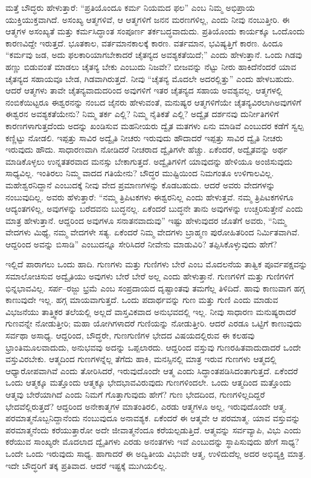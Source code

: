 ಮತ್ತೆ ಬೌದ್ಧರು ಹೇಳುತ್ತಾರೆ: “ಪ್ರತಿಯೊಂದೂ ಕರ್ಮ ನಿಯಮದ ಫಲ” ಎಂಬ ನಿಮ್ಮ ಅಭಿಪ್ರಾಯ ಯುಕ್ತಿಯುಕ್ತವಾಗಿದೆ. ಅಸಂಖ್ಯ ಆತ್ಮಗಳಿವೆ, ಆ ಆತ್ಮಗಳಿಗೆ ಜನನ ಮರಣಗಳಿಲ್ಲ, ಎಂದು ನೀವು ನಂಬುತ್ತೀರಿ. ಈ ಆತ್ಮಗಳ ಅಸಂಖ್ಯತೆ ಮತ್ತು ಕರ್ಮಸಿದ್ಧಾಂತ ಸಂಪೂರ್ಣ ತರ್ಕಬದ್ಧವಾದುದು. ಪ್ರತಿಯೊಂದು ಕಾರ್ಯಕ್ಕೂ ಒಂದೊಂದು ಕಾರಣವಿದ್ದೇ ಇರುತ್ತದೆ. ಭೂತಕಾಲ, ವರ್ತಮಾನಕಾಲಕ್ಕೆ ಕಾರಣ. ವರ್ತಮಾನ, ಭವಿಷ್ಯತ್ತಿಗೆ ಕಾರಣ. ಹಿಂದೂ “ಕರ್ಮವು ಜಡ, ಅದು ಫಲಕಾರಿಯಾಗಬೇಕಾದರೆ ಚೈತನ್ಯದ ಅವಶ್ಯಕತೆಯಿದೆ;” ಎಂದು ಹೇಳುತ್ತಾನೆ. ಒಂದು ಗಿಡವು ಹಣ್ಣು ಬಿಡುವಂತೆ ಮಾಡಲು ಚೈತನ್ಯ ಬೇಕು ಎಂಬುದು ನಿಜವೇ? ಬೀಜವನ್ನು ನೆಟ್ಟು ನೀರು ಹಾಕಿದೆನೆಂದರೆ ಯಾವ ಚೈತನ್ಯದ ಸಹಾಯವೂ ಬೇಡ, ಗಿಡವಾಗಿರುತ್ತದೆ. ನೀವು “ಚೈತನ್ಯ ಮೊದಲೇ ಅದರಲ್ಲಿತ್ತು” ಎಂದು ಹೇಳಬಹುದು. ಆದರೆ ಆತ್ಮಗಳು ತಾವೇ ಚೈತನ್ಯವಾದುದರಿಂದ ಅವುಗಳಿಗೆ ಇತರ ಚೈತನ್ಯದ ಸಹಾಯ ಅವಶ್ಯವಲ್ಲ. ಆತ್ಮಗಳಲ್ಲಿ ನಂಬಿಕೆಯಿಟ್ಟರೂ ಈಶ್ವರನನ್ನು ನಂಬದ ಜೈನರು ಹೇಳುವಂತೆ, ಮನುಷ್ಯರ ಆತ್ಮಗಳಿಗೆಯೇ ಚೈತನ್ಯವಿರಲಾಗಿ\break ಅವುಗಳಿಗೆ ಈಶ್ವರನ ಅವಶ್ಯಕತೆಯೇನು? ನಿಮ್ಮ ತರ್ಕ ಎಲ್ಲಿ? ನಿಮ್ಮ ನೈತಿಕತೆ ಎಲ್ಲಿ? ಅದ್ವೈತ ದರ್ಶನವು ದುರ್ನೀತಿಗಳಿಗೆ ಕಾರಣಗಳಾಗುತ್ತದೆಂದು ಅದನ್ನು ಖಂಡಿಸುವ ಮಹನೀಯರು ದ್ವೈತ ಮತಗಳು ಏನು ಮಾಡಿವೆ ಎಂಬುದರ ಕಡೆಗೆ ಸ್ವಲ್ಪ ಕಣ್ಣಿಟ್ಟು ನೋಡಲಿ. ಇಪ್ಪತ್ತು ಸಾವಿರ ಅದ್ವೈತಿ ನೀಚರು ಇರುವುದು ಹೌದಾದರೆ ಇಪ್ಪತ್ತು ಸಾವಿರ ದ್ವೈತಿ ನೀಚರು ಇರುವುದು ಹೌದು. ಸಾಧಾರಣವಾಗಿ ನೋಡಿದರೆ ನೀಚರಾದ ದ್ವೈತಿಗಳೇ ಹೆಚ್ಚು. ಏಕೆಂದರೆ, ಅದ್ವೈತವನ್ನು ಅರ್ಥ ಮಾಡಿಕೊಳ್ಳಲು ಉನ್ನತತರವಾದ ಮನಸ್ಸು ಬೇಕಾಗುತ್ತದೆ. ಅದ್ವೈತಿಗಳಿಗೆ ಯಾವುದನ್ನು ಹೇಳಿಯೂ ಅಂಜಿಸುವುದು ಸಾಧ್ಯವಿಲ್ಲ. ಇಂತಿರಲು ನಿಮ್ಮ ವಾದದ ಗತಿಯೇನು? ಬೌದ್ಧರ ಮುಷ್ಟಿಯಿಂದ ನಿಮಗಂತೂ ಉಳಿಗಾಲವಿಲ್ಲ. ಮಹೇಶ್ವರನಿದ್ದಾನೆ ಎಂಬುದಕ್ಕೆ ನೀವು ವೇದ ಪ್ರಮಾಣಗಳನ್ನು ಕೊಡಬಹುದು. ಆದರೆ ಅವರು ವೇದಗಳನ್ನು ನಂಬುವುದಿಲ್ಲ. ಅವರು ಹೆಳುತ್ತಾರೆ: “ನಮ್ಮ ತ್ರಿಪಿಟಕಗಳು ಈಶ್ವರನಿಲ್ಲ ಎಂದು ಹೇಳುತ್ತವೆ. ನಮ್ಮ ತ್ರಿಪಿಟಕಗಳಿಗೂ ಆದ್ಯಂತಗಳಿಲ್ಲ, ಅವುಗಳನ್ನು ಬರೆದವನು ಬುದ್ಧನಲ್ಲ. ಏಕೆಂದರೆ ಬುದ್ಧನೇ ತಾನು ಅವುಗಳನ್ನು ಉಚ್ಚರಿಸುತ್ತೇನೆ ಎಂದು ಮಾತ್ರ ಹೇಳುತ್ತಾನೆ. ಆದ್ದರಿಂದ ಅವುಗಳೂ ಸನಾತನವಾದುವು” ಇಷ್ಟು ಹೇಳುವುದರ ಜೊತೆಗೆ ಅವರು, “ನಿಮ್ಮ ವೇದಗಳು ಮಿಥ್ಯೆ, ನಮ್ಮ ವೇದಗಳೇ ಸತ್ಯ. ಏಕೆಂದರೆ ನಿಮ್ಮ ವೇದಗಳು ಬ್ರಾಹ್ಮಣ ಪುರೋಹಿತರಿಂದ ನಿರ್ಮಿತವಾಗಿವೆ. ಆದ್ದರಿಂದ ಅವನ್ನು ಬಿಸಾಡಿ” ಎಂಬುದನ್ನೂ ಸೇರಿಸಿದರೆ ನೀವೇನು ಮಾಡುವಿರಿ? ತಪ್ಪಿಸಿಕೊಳ್ಳುವುದು ಹೇಗೆ?

ಇಲ್ಲಿದೆ ಪಾರಾಗಲು ಒಂದು ಹಾದಿ. ಗುಣಗಳು ಮತ್ತು ಗುಣಿಗಳು ಬೇರೆ ಎಂಬ ಮೊದಲನೆಯ ತಾತ್ವಿಕ ಪೂರ್ವಪಕ್ಷವನ್ನು ಸಮಾಲೋಚಿಸುವ ಅದ್ವೈತಿಯು ಅವುಗಳು ಬೇರೆ ಬೇರೆ ಅಲ್ಲ ಎಂದು ಹೇಳುತ್ತಾನೆ. ಗುಣಗಳಿಗೆ ಮತ್ತು ಗುಣಿಗಳಿಗೆ ಭಿನ್ನಭಾವವಿಲ್ಲ. ಸರ್ಪ–ರಜ್ಜು ಭ್ರಮೆ ಎಂಬ ಸಂಪ್ರದಾಯದ ದೃಷ್ಟಾಂತವು ತಮಗೆಲ್ಲ ತಿಳಿದಿದೆ. ಹಾವು ಕಾಣುವಾಗ ಹಗ್ಗ ಕಾಣುವುದೇ ಇಲ್ಲ. ಹಗ್ಗ ಮಾಯವಾಗುತ್ತದೆ. ಒಂದು ಪದಾರ್ಥವನ್ನು ಗುಣ ಮತ್ತು ಗುಣಿ ಎಂದು ಮಾಡುವ ವಿಭಜನೆಯು ತಾತ್ತ್ವಿಕರ ತಲೆಯಲ್ಲಿ ಅಲ್ಲದೆ ವಾಸ್ತವಿಕವಾದ ಅನುಭವದಲ್ಲಿ ಇಲ್ಲ. ನೀವು ಸಾಧಾರಣ ಮನುಷ್ಯರಾದರೆ ಗುಣವನ್ನೇ ನೋಡುತ್ತೀರಿ; ಮಹಾ ಯೋಗಿಗಳಾದರೆ ಗುಣಿಯನ್ನು ನೋಡುತ್ತೀರಿ. ಆದರೆ ಎರಡೂ ಒಟ್ಟಿಗೆ ಕಾಣುವುದು ಸರ್ವಥಾ ಅಸಾಧ್ಯ. ಆದ್ದರಿಂದ, ಬೌದ್ಧರೇ, ಗುಣಗುಣಿಗಳ ಭೇದದ ವಿಷಯದಲ್ಲಿರುವ ಈ ಕಲಹವು ಭ್ರಾಂತಿಮೂಲವಾದುದು, ಅನುಭವವು ಅದನ್ನು ಒಪ್ಪಲಾರದು. ಆದ್ದರಿಂದ ವಸ್ತುವು ಗುಣರಹಿತವಾದುದಾದರೆ ಒಂದೇ ವಸ್ತುವಿರಬೇಕು. ಆತ್ಮದಿಂದ ಗುಣಗಳನ್ನೆಲ್ಲ ತೆಗೆದು ಹಾಕಿ, ಮನಸ್ಸಿನಲ್ಲಿ ಮಾತ್ರ ಇರುವ ಗುಣಗಳು ಆತ್ಮದಲ್ಲಿ ಆಧ್ಯಾರೋಪವಾಗಿವೆ ಎಂದು ತೋರಿಸಿದರೆ, ಇರುವುದೊಂದೇ ಆತ್ಮ ಎಂದು ಸಿದ್ಧಾಂತಪಡಿಸಿದಂತಾಗುತ್ತದೆ. ಏಕೆಂದರೆ ಒಂದು ಆತ್ಮಕ್ಕೂ ಮತ್ತೊಂದು ಆತ್ಮಕ್ಕೂ ಭೇದಭಾವವಿರುವುದು ಗುಣಗಳಿಂದಲೇ. ಒಂದು ಆತ್ಮದಿಂದ ಮತ್ತೊಂದು ಆತ್ಮವು ಬೇರೆಯಾಗಿದೆ ಎಂದು ನಿಮಗೆ ಗೊತ್ತಾಗುವುದು ಹೇಗೆ? ಗುಣ ಭೇದದಿಂದ, ಗುಣಗಳಿಲ್ಲದಿದ್ದರೆ ಭೇದವೆಲ್ಲಿರುತ್ತದೆ? ಆದ್ದರಿಂದ ಅನೇಕಾತ್ಮಗಳ ಮಾತಂತಿರಲಿ, ಎರಡು ಆತ್ಮಗಳೂ ಅಲ್ಲ, ಇರುವುದೊಂದೇ ಆತ್ಮ. ಪರಮಾತ್ಮನೊಬ್ಬನಿದ್ದಾನೆಂದು ನಂಬುವುದೂ ಅನಾವಶ್ಯಕ. ಏಕೆಂದರೆ ಈ ಆತ್ಮವೇ ಆ ಪರಮಾತ್ಮ. ಯಾವ ವಸ್ತುವನ್ನು ಪರಮಾತ್ಮನೆಂದು ಕರೆಯುತ್ತಾರೋ ಅದೇ ಜೀವಾತ್ಮನೆಂದೂ ಕರೆಯಲ್ಪಡುತ್ತಿದೆ. ಆತ್ಮವನ್ನು ಸರ್ವವ್ಯಾಪಿ, ವಿಭು ಎಂದು ಕರೆಯುವ ಸಾಂಖ್ಯರೇ ಮೊದಲಾದ ದ್ವೈತಿಗಳು ಎರಡು ಅನಂತಗಳು ಇವೆ ಎಂಬುದನ್ನು ಸ್ಥಾಪಿಸುವುದು ಹೇಗೆ ಸಾಧ್ಯ? ಒಂದೇ ಒಂದು ಇರುವುದು ಸಾಧ್ಯ. ಹಾಗಾದರೆ ಈ ಅದ್ವಿತೀಯ ವಿಭುವೇ ಆತ್ಮ, ಉಳಿದುದೆಲ್ಲ ಅದರ ಅಭಿವ್ಯಕ್ತಿ ಮಾತ್ರ. ಇದೇ ಬೌದ್ಧರಿಗೆ ತಕ್ಕ ಪ್ರತಿವಾದ. ಆದರೆ ಇಷ್ಟಕ್ಕೆ ಮುಗಿಯಲಿಲ್ಲ. 

